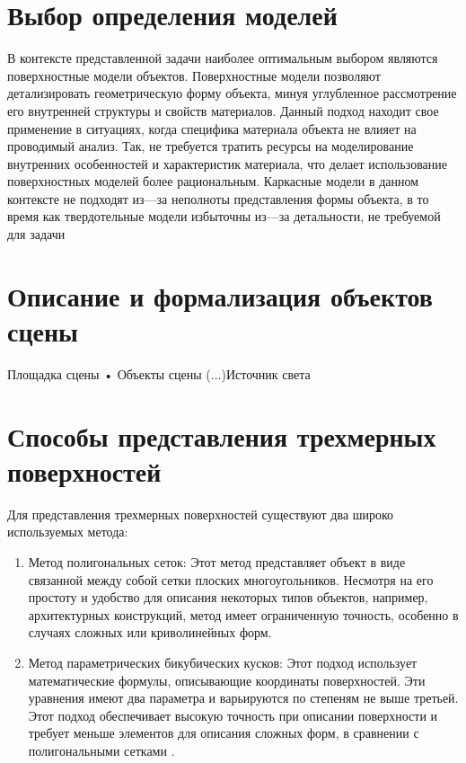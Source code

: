 \section*{Выбор определения моделей} %
В контексте представленной задачи наиболее оптимальным выбором являются поверхностные модели объектов. Поверхностные модели позволяют детализировать геометрическую форму объекта, минуя углубленное рассмотрение его внутренней структуры и свойств материалов. Данный подход находит свое применение в ситуациях, когда специфика материала объекта не влияет на проводимый анализ. Так, не требуется тратить ресурсы на моделирование внутренних особенностей и характеристик материала, что делает использование поверхностных моделей более рациональным. Каркасные модели в данном контексте не подходят из---за неполноты представления формы объекта, в то время как твердотельные модели избыточны из---за детальности, не требуемой для задачи

\section{ Описание и  формализация  объектов сцены} %

Площадка сцены   • Объекты сцены (...)Источник света 




\section{Способы представления трехмерных поверхностей}

Для представления трехмерных поверхностей существуют два широко используемых метода:

\begin{enumerate}
\item Метод полигональных сеток: Этот метод представляет объект в виде связанной между собой сетки плоских многоугольников. Несмотря на его простоту и удобство для описания некоторых типов объектов, например, архитектурных конструкций, метод имеет ограниченную точность, особенно в случаях сложных или криволинейных форм.
\item Метод параметрических бикубических кусков: Этот подход использует математические формулы, описывающие координаты поверхностей. Эти уравнения имеют два параметра и варьируются по степеням не выше третьей. Этот подход обеспечивает высокую точность при описании поверхности и требует меньше элементов для описания сложных форм, в сравнении с полигональными сетками \cite{model_geom}.
\end{enumerate}

